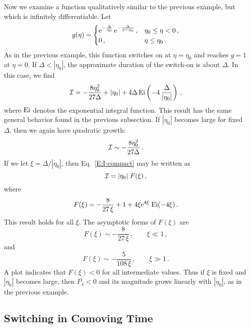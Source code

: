 \documentclass[preprint,prd,showpacs,superscriptaddress]{revtex4}
\begin{document}
Now we examine a function qualitatively similar to the previous example, but which is infinitely differentiable. Let
\begin{equation}
g(\eta)=\begin{cases}
			{\rm e}^{-\frac{\Delta}{\eta_0}} \, {\rm e}^{-\frac{\Delta}{\eta-\eta_{0}}}\,,&\eta_{0}\leq\eta<0\,,\\
			0\,,&\eta\leq\eta_{0}\,.
			\label{E:compact}
		\end{cases}
\end{equation}
As in the previous example, this function switches on at $\eta = \eta_0$ and reaches $g=1$ at $\eta = 0$. If $\Delta < |\eta_0|$,
the approximate duration of the switch-on is about $\Delta$. In this case, we find
\begin{equation}
{\cal I}  = -\frac{8\eta^{2}_{0}}{27\Delta} + |\eta_0| + 4\Delta\, {\rm Ei}\left(-4\,\frac{\Delta}{ |\eta_0|} \right) \,, 
\label{E:I-compact}
\end{equation}
where ${\rm Ei}$ denotes the exponential integral function.
This result has the same general behavior found in the previous subsection. If  $|\eta_0|$ becomes large for fixed $\Delta$, then
we again have quadratic growth:
\begin{equation}
{\cal I}   \sim -\frac{8\eta^{2}_{0}}{27\Delta} \,.
\end{equation}
If we let $\xi = \Delta/|\eta_0|$, then Eq.~\eqref{E:I-compact} may be written as
\begin{equation}
{\cal I}  = |\eta_0|\; F(\xi) \,,
\end{equation}
where 
\begin{equation}
F(\xi) = -\frac{8}{27 \, \xi} +1 + 4 \xi {\rm e}^{4 \xi} \; {\rm Ei}(-4 \xi) \,.
\end{equation}
This result holds for all $\xi$. The asymptotic forms of $F(\xi)$ are
\begin{equation}
F(\xi) \sim  -\frac{8}{27 \, \xi}\,, \qquad \xi \ll 1\,, 
\end{equation}
and
\begin{equation}
F(\xi) \sim  -\frac{5}{108 \, \xi}\,, \qquad \xi \gg 1\,.
\end{equation}
A plot  indicates that $F(\xi) < 0$  for all intermediate values. Thus if $\xi$ is fixed and $|\eta_0|$ becomes large, then $P_4 <0$
and its magnitude grows linearly with  $|\eta_0|$, as in the previous example.

 \subsection{ Switching in Comoving Time}
  
\end{document}
